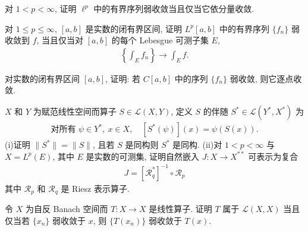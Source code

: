 \documentclass[../../main.tex]{subfiles}
\begin{document}
\begin{exercise}\label{exercise:ch14-37}
对 $1<p<\infty$, 证明 $\ell^{p}$ 中的有界序列弱收敛当且仅当它依分量收敛.
\end{exercise}

\begin{exercise}\label{exercise:ch14-38}
对 $1\leqslant p\leqslant\infty$, $[a,b]$ 是实数的闭有界区间, 证明 $L^{p}[a,b]$ 中的有界序列 $\{f_{n}\}$ 弱收敛到 $f$, 当且仅当对 $[a,b]$ 的每个 Lebesgue 可测子集 $E$,
\begin{align*}
\left\{\int_{E}f_{n}\right\}\to\int_{E}f.
\end{align*}
\end{exercise}

\begin{exercise}\label{exercise:ch14-39}
对实数的闭有界区间 $[a,b]$, 证明: 若 $C[a,b]$ 中的序列 $\{f_{n}\}$ 弱收敛, 则它逐点收敛.
\end{exercise}

\begin{exercise}\label{exercise:ch14-40}
$X$ 和 $Y$ 为赋范线性空间而算子 $S\in\mathcal{L}(X,Y)$, 定义 $S$ 的伴随 $S^{*}\in\mathcal{L}(Y^{*},X^{*})$ 为
\begin{align*}
\text{对所有 }\psi\in Y^{*},\ x\in X,\quad[S^{*}(\psi)](x)=\psi(S(x)).
\end{align*}
(i)证明 $\|S^{*}\|=\|S\|$, 且若 $S$ 是同构则 $S^{*}$ 是同构.
(ii)对 $1<p<\infty$ 与 $X=L^{p}(E)$, 其中 $E$ 是实数的可测集, 证明自然嵌入 $J:X\to X^{**}$ 可表示为复合
\begin{align*}
J=[\mathcal{R}_{q}^{*}]^{-1}\circ\mathcal{R}_{p}
\end{align*}
其中 $\mathcal{R}_{p}$ 和 $\mathcal{R}_{q}$ 是 Riesz 表示算子.
\end{exercise}

\begin{exercise}\label{exercise:ch14-41}
令 $X$ 为自反 Banach 空间而 $T:X\to X$ 是线性算子. 证明 $T$ 属于 $\mathcal{L}(X,X)$ 当且仅当若 $\{x_{n}\}$ 弱收敛于 $x$, 则 $\{T(x_{n})\}$ 弱收敛于 $T(x)$.
\end{exercise}
\end{document}
